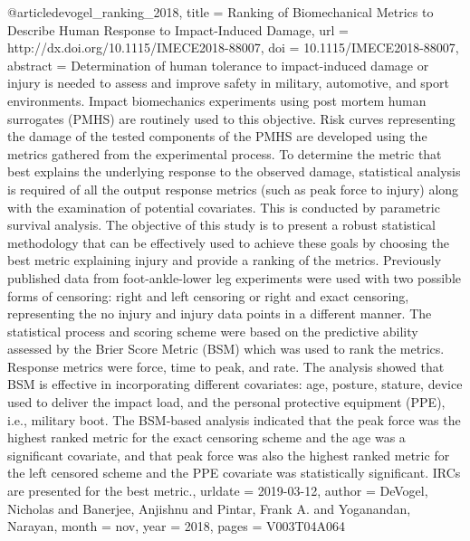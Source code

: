@article{devogel_ranking_2018,
	title = {Ranking of {Biomechanical} {Metrics} to {Describe} {Human} {Response} to {Impact}-{Induced} {Damage}},
	url = {http://dx.doi.org/10.1115/IMECE2018-88007},
	doi = {10.1115/IMECE2018-88007},
	abstract = {Determination of human tolerance to impact-induced damage or injury is needed to assess and improve safety in military, automotive, and sport environments. Impact biomechanics experiments using post mortem human surrogates (PMHS) are routinely used to this objective. Risk curves representing the damage of the tested components of the PMHS are developed using the metrics gathered from the experimental process. To determine the metric that best explains the underlying response to the observed damage, statistical analysis is required of all the output response metrics (such as peak force to injury) along with the examination of potential covariates. This is conducted by parametric survival analysis. The objective of this study is to present a robust statistical methodology that can be effectively used to achieve these goals by choosing the best metric explaining injury and provide a ranking of the metrics. Previously published data from foot-ankle-lower leg experiments were used with two possible forms of censoring: right and left censoring or right and exact censoring, representing the no injury and injury data points in a different manner. The statistical process and scoring scheme were based on the predictive ability assessed by the Brier Score Metric (BSM) which was used to rank the metrics. Response metrics were force, time to peak, and rate. The analysis showed that BSM is effective in incorporating different covariates: age, posture, stature, device used to deliver the impact load, and the personal protective equipment (PPE), i.e., military boot. The BSM-based analysis indicated that the peak force was the highest ranked metric for the exact censoring scheme and the age was a significant covariate, and that peak force was also the highest ranked metric for the left censored scheme and the PPE covariate was statistically significant. IRCs are presented for the best metric.},
	urldate = {2019-03-12},
	author = {DeVogel, Nicholas and Banerjee, Anjishnu and Pintar, Frank A. and Yoganandan, Narayan},
	month = nov,
	year = {2018},
	pages = {V003T04A064}
}

